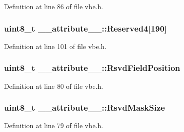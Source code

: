 Definition at line 86 of file vbe.\+h.

\hypertarget{struct____attribute_____ab859fb715f83f005dfa2f13d8b0e4ff0}{}
\subsubsection[{Reserved4}]{\setlength{\rightskip}{0pt plus 5cm}uint8\+\_\+t \+\_\+\+\_\+attribute\+\_\+\+\_\+\+::\+Reserved4\mbox{[}190\mbox{]}}\label{struct____attribute_____ab859fb715f83f005dfa2f13d8b0e4ff0}


Definition at line 101 of file vbe.\+h.

\hypertarget{struct____attribute_____a61fb6dc07b7edbd8a3a94745336f256c}{}
\subsubsection[{Rsvd\+Field\+Position}]{\setlength{\rightskip}{0pt plus 5cm}uint8\+\_\+t \+\_\+\+\_\+attribute\+\_\+\+\_\+\+::\+Rsvd\+Field\+Position}\label{struct____attribute_____a61fb6dc07b7edbd8a3a94745336f256c}


Definition at line 80 of file vbe.\+h.

\hypertarget{struct____attribute_____a73862db83bdb9b6d31356af3cec7a5be}{}
\subsubsection[{Rsvd\+Mask\+Size}]{\setlength{\rightskip}{0pt plus 5cm}uint8\+\_\+t \+\_\+\+\_\+attribute\+\_\+\+\_\+\+::\+Rsvd\+Mask\+Size}\label{struct____attribute_____a73862db83bdb9b6d31356af3cec7a5be}


Definition at line 79 of file vbe.\+h.

\hypertarget{struct____attribute_____a5659e88b961bf423d6385f315264e005}{}
